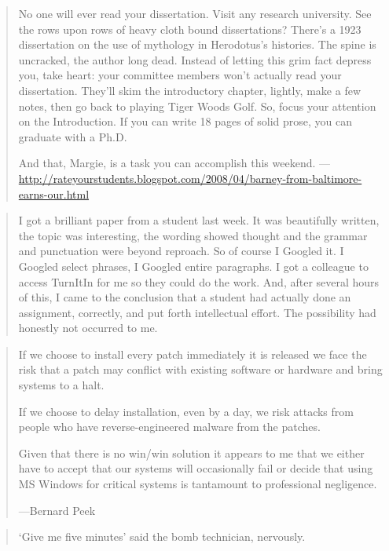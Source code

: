\documentclass[a4paper]{article}
\begin{document}
\medskip
\begin{quote}
	No one will ever read your dissertation. Visit any research
	university. See the rows upon rows of heavy cloth bound
	dissertations? There's a 1923 dissertation on the use of
	mythology in Herodotus's histories. The spine is uncracked,
	the author long dead. Instead of letting this grim fact
	depress you, take heart: your committee members won't
	actually read your dissertation. They'll skim the introductory
	chapter, lightly, make a few notes, then go back to playing
	Tiger Woods Golf. So, focus your attention on the Introduction.
	If you can write 18 pages of solid prose, you can graduate
	with a Ph.D.

	And that, Margie, is a task you can accomplish this weekend. 
	---\url{http://rateyourstudents.blogspot.com/2008/04/barney-from-baltimore-earns-our.html}
\end{quote}

\medskip
\begin{quote}
	I got a brilliant paper from a student last week. It was beautifully
	written, the topic was interesting, the wording showed thought and
	the grammar and punctuation were beyond reproach. So of course I
	Googled it. I Googled select phrases, I Googled entire paragraphs.
	I got a colleague to access TurnItIn for me so they could do the
	work. And, after several hours of this, I came to the conclusion
	that a student had actually done an assignment, correctly, and put
	forth intellectual effort. The possibility had honestly not
	occurred to me.~\citep{RYS2008a}
\end{quote}

\medskip
\begin{quote}
	If we choose to install every patch immediately it is released we face the
	risk that a patch may conflict with existing software or hardware and bring
	systems to a halt.

	If we choose to delay installation, even by a day, we risk attacks from
	people who have reverse-engineered malware from the patches.

	Given that there is no win/win solution it appears to me that we either have
	to accept that our systems will occasionally fail or decide that using MS
	Windows for critical systems is tantamount to professional negligence.

	---Bernard Peek~\citep{Peek2009a}
\end{quote}

\medskip
\begin{quote}
	`Give me five minutes' said the bomb technician, nervously.
\end{quote}
\end{document}
